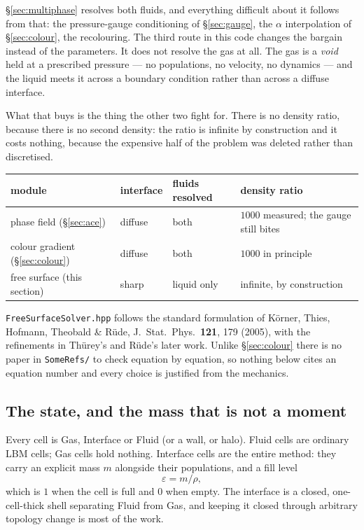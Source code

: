 \documentclass[11pt,a4paper]{article}
\newcommand{\code}[1]{\texttt{\small #1}}
\begin{document}
\S\ref{sec:multiphase} resolves both fluids, and everything difficult about it
follows from that: the pressure-gauge conditioning of \S\ref{sec:gauge}, the
$\alpha$ interpolation of \S\ref{sec:colour}, the recolouring. The third route
in this code changes the bargain instead of the parameters. It does not resolve
the gas at all. The gas is a \emph{void} held at a prescribed pressure --- no
populations, no velocity, no dynamics --- and the liquid meets it across a
boundary condition rather than across a diffuse interface.

What that buys is the thing the other two fight for. There is no density ratio,
because there is no second density: the ratio is infinite by construction and it
costs nothing, because the expensive half of the problem was deleted rather than
discretised.

\begin{center}
\begin{tabular}{llll}
\toprule
module & interface & fluids resolved & density ratio \\
\midrule
phase field (\S\ref{sec:ace}) & diffuse & both & $1000$ measured; the gauge still bites \\
colour gradient (\S\ref{sec:colour}) & diffuse & both & $1000$ in principle \\
free surface (this section) & sharp & liquid only & infinite, by construction \\
\bottomrule
\end{tabular}
\end{center}

\code{FreeSurfaceSolver.hpp} follows the standard formulation of K\"orner,
Thies, Hofmann, Theobald \& R\"ude, J.\ Stat.\ Phys.\ \textbf{121}, 179 (2005),
with the refinements in Th\"urey's and R\"ude's later work. Unlike
\S\ref{sec:colour} there is no paper in \code{SomeRefs/} to check equation by
equation, so nothing below cites an equation number and every choice is
justified from the mechanics.

\subsection{The state, and the mass that is not a moment}

Every cell is Gas, Interface or Fluid (or a wall, or halo). Fluid cells are
ordinary LBM cells; Gas cells hold nothing. Interface cells are the entire
method: they carry an explicit mass $m$ alongside their populations, and a fill
level
\begin{equation}
  \varepsilon = m / \rho,
\end{equation}
which is $1$ when the cell is full and $0$ when empty. The interface is a
closed, one-cell-thick shell separating Fluid from Gas, and keeping it closed
through arbitrary topology change is most of the work.
\end{document}
